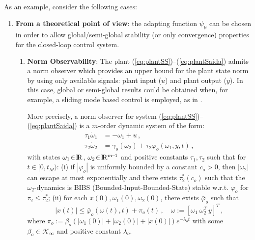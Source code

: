 \documentclass[letterpaper, 10 pt, journal, twocolumn]{IEEEtran}  %
\def\re{{\rm I}\! {\rm R}}
\theoremstyle{plain}
\theoremstyle{definition}
\theoremstyle{remark}
\begin{document}
As an example, consider the following cases:
%
\begin{enumerate}

\item {\bf From a theoretical point of view}: the adapting function $\psi_\mu$ can be chosen in order to allow global/semi-global stability (or only convergence) properties for the closed-loop control system. 

\begin{enumerate}

\item {\bf Norm Observability}: The plant
(\ref{eq:plantSS})--(\ref{eq:plantSaida}) admits a norm observer which provides an upper bound for the plant state norm by using only  available signals: plant input ($u$) and plant output ($y$). In this case, global or semi-global results could be obtained when, for example, a sliding mode based control is employed, as in \cite{POH:2011}.  


More precisely, a norm observer for system
(\ref{eq:plantSS})--(\ref{eq:plantSaida})  is a $m$-order
dynamic system of the form:
%
\begin{align}
\tau_1 \dot{\omega}_1 &= -\omega_1+u\,, \label{eq:defuav} \\
\tau_2 \dot{\omega}_2 &=
\gamma_o(\omega_2)+\tau_2\varphi_o(\omega_1,y,t)\,,\label{eq:normobsgeneric}
\end{align}
%
with states $\omega_1\!\in\!\re$, $\omega_2\!\in\!\re^{m\!-\!1}$ and
positive constants $\tau_1, \tau_2$ such that for $t\in[0,t_M)$: (i)
if $|\varphi_o|$ is uniformly bounded by a constant $c_o\!>\!0$,
then $|\omega_2|$ can escape at most exponentially and there exists
$\tau_2^*(c_o)$ such that the $\omega_2$-dynamics is BIBS
(Bounded-Input-Bounded-State) stable w.r.t. $\varphi_o$ for
$\tau_2\leq \tau_2^*$; (ii)
for each $x(0),\omega_1(0),\omega_2(0)$, there exists $\bar{\varphi}_o$ such that
%
\begin{equation}
|x(t)| \leq \bar{\varphi}_o(\omega(t),t) + \pi_o(t) \,, \quad
\omega:=[\omega_1 \ \omega_2^T \ y]^T\,,\label{eq:xboundfromw}
\end{equation}
%
where
$\pi_o:=\beta_o(|\omega_1(0)|\!+\!|\omega_2(0)|\!+\!|x(0)|)e^{-\lambda_o
t}$ with some $\beta_o \in \mathcal{K}_\infty$ and positive
constant $\lambda_o$.




\end{enumerate}
\end{enumerate}
\end{document}
